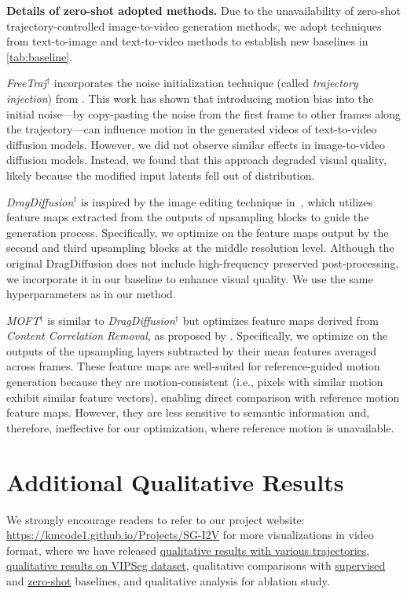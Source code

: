 \documentclass{article} \usepackage{iclr2025_conference,times}
\begin{document}
\textbf{Details of zero-shot adopted methods.} Due to the unavailability of zero-shot trajectory-controlled image-to-video generation methods, we adopt techniques from text-to-image and text-to-video methods to establish new baselines in \cref{tab:baseline}.

\textit{FreeTraj$^\dagger$} incorporates the noise initialization technique (called \textit{trajectory injection}) from \citep{qiu2024freetraj}. This work has shown that introducing motion bias into the initial noise—by copy-pasting the noise from the first frame to other frames along the trajectory—can influence motion in the generated videos of text-to-video diffusion models. However, we did not observe similar effects in image-to-video diffusion models. Instead, we found that this approach degraded visual quality, likely because the modified input latents fell out of distribution.

\textit{DragDiffusion$^\dagger$} is inspired by the image editing technique in~\citep{shi2024dragdiffusion}, which utilizes feature maps extracted from the outputs of upsampling blocks to guide the generation process. Specifically, we optimize on the feature maps output by the second and third upsampling blocks at the middle resolution level. Although the original DragDiffusion does not include high-frequency preserved post-processing, we incorporate it in our baseline to enhance visual quality. We use the same hyperparameters as in our method.

\textit{MOFT$^\dagger$} is similar to \textit{DragDiffusion$^\dagger$} but optimizes feature maps derived from \textit{Content Correlation Removal}, as proposed by \citet{MOFT}. Specifically, we optimize on the outputs of the upsampling layers subtracted by their mean features averaged across frames. These feature maps are well-suited for reference-guided motion generation because they are motion-consistent (i.e., pixels with similar motion exhibit similar feature vectors), enabling direct comparison with reference motion feature maps. However, they are less sensitive to semantic information and, therefore, ineffective for our optimization, where reference motion is unavailable.

\section{Additional Qualitative Results}
We strongly encourage readers to refer to our project website: \url{https://kmcode1.github.io/Projects/SG-I2V} for more visualizations in video format, where we have released \href{https://kmcode1.github.io/Projects/SG-I2V\#obj-motion-results}{qualitative results with various trajectories}, \href{https://kmcode1.github.io/Projects/SG-I2V/gallery_VIPSeg.html}{qualitative results on VIPSeg dataset}, qualitative comparisons with \href{https://kmcode1.github.io/Projects/SG-I2V\#baseline-comparison}{supervised} and \href{https://kmcode1.github.io/Projects/SG-I2V/gallery_zero.html}{zero-shot} baselines, and qualitative analysis for ablation study.
\end{document}
